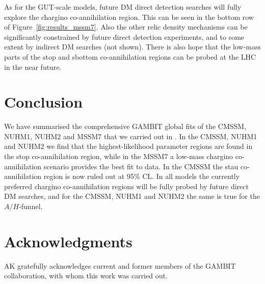 \documentclass{PoS}
\begin{document}
As for the GUT-scale models, future DM direct detection searches will fully explore the chargino co-annihilation region. This can be seen in the bottom row of Figure~\ref{fig:results_mssm7}. Also the other relic density mechanisms can be significantly constrained by future direct detection experiments, and to some extent by indirect DM searches (not shown). There is also hope that the low-mass parts of the stop and sbottom co-annihilation regions can be probed at the LHC in the near future.



\section{Conclusion}

We have summarised the comprehensive GAMBIT global fits of the CMSSM, NUHM1, NUHM2 and MSSM7 that we carried out in \cite{CMSSM,MSSM}.  In the CMSSM, NUHM1 and NUHM2 we find that the highest-likelihood parameter regions are found in the stop co-annihilation region, while in the MSSM7 a low-mass chargino co-annihilation scenario provides the best fit to data.  In the CMSSM the stau co-annihilation region is now ruled out at 95\% CL. In all models the currently preferred chargino co-annihilation regions will be fully probed by future direct DM searches, and for the CMSSM, NUHM1 and NUHM2 the same is true for the $A/H$-funnel.



\section*{Acknowledgments}

AK gratefully acknowledges current and former members of the GAMBIT collaboration, with whom this work was carried out.





\end{document}
